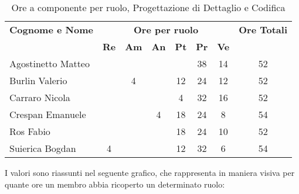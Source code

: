 \begin{table}[h]
	\centering
	\begin{tabular}{|l|c|c|c|c|c|c|c|}
		\toprule
		\textbf{Cognome e Nome} & \multicolumn{6}{c}{\textbf{Ore per ruolo}} & \textbf{Ore Totali} \\
		& \textbf{Re} & \textbf{Am} & \textbf{An} & \textbf{Pt} & \textbf{Pr} & \textbf{Ve} & \\
		
		\midrule
		Agostinetto Matteo & & & & & 38 & 14 & 52 \\
		Burlin Valerio & & 4 & & 12 & 24 & 12 & 52 \\ 
		Carraro Nicola & & & & 4 & 32 & 16 & 52 \\
		Crespan Emanuele & & & 4 & 18 & 24 & 8 & 54 \\
		Ros Fabio & & & & 18 & 24 & 10 & 52 \\
		Suierica Bogdan & 4 & & & 12 & 32 & 6 & 54 \\
		
		\bottomrule
	\end{tabular}
	\caption{Ore a componente per ruolo, Progettazione di Dettaglio e Codifica}
\end{table}

\noindent I valori sono riassunti nel seguente grafico, che rappresenta in maniera visiva per quante ore un membro abbia ricoperto un determinato ruolo:

